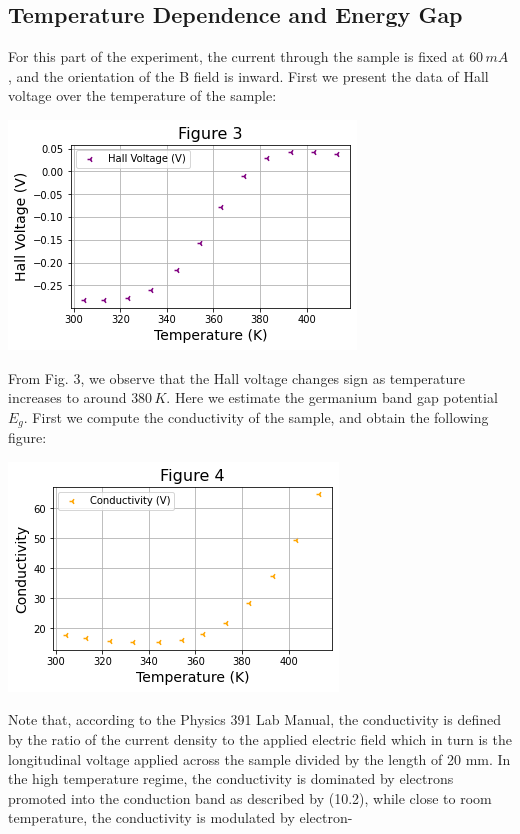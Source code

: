 \documentclass[11pt]{book}
\theoremstyle{break}
\theoremstyle{break}
\begin{document}
\subsection{Temperature Dependence and Energy Gap}
For this part of the experiment, the current through the sample is fixed at $60\, mA$, and the orientation of the B field is inward. First we present the data of Hall voltage over the temperature of the sample:
\begin{center}
\includegraphics[scale=0.6]{3}
\end{center}
From Fig. 3, we observe that the Hall voltage changes sign as temperature increases to around $380\, K$. Here we estimate the germanium band gap potential $E_g$. First we compute the conductivity of the sample, and obtain the following figure:
\begin{center}
\includegraphics[scale=0.6]{4}
\end{center}
Note that, according to the Physics 391 Lab Manual, the conductivity is defined by the ratio of the current density to the applied electric field which in turn is the longitudinal  voltage applied across the sample  divided by the length of 20 mm. In  the high temperature regime, the conductivity is dominated by electrons promoted into the conduction band as 
described  by (10.2), while  close  to  room  temperature,  the  conductivity  is  modulated  by  electron-
\end{document}
